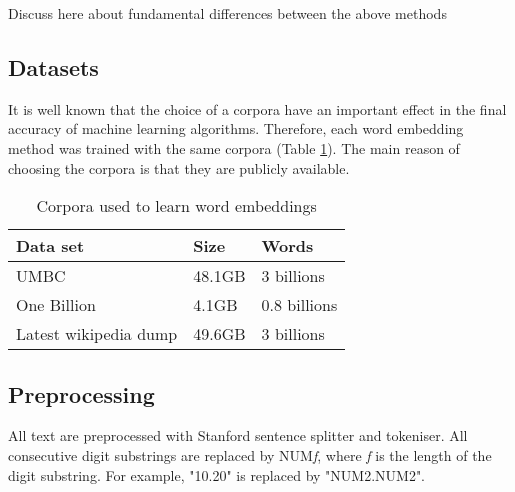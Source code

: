 {\color{red}Discuss here about fundamental differences between the above methods}

\subsection{Datasets}
It is well known that the choice of a corpora have an important effect in the final accuracy of machine learning algorithms. 
Therefore, each word embedding method was trained with the same corpora (Table \ref{wordEmbedCorpora}). The main reason of choosing the corpora 
is that they are publicly available. 

\begin{table}[h]
\begin{center}
\begin{small}
\begin{tabular}{lll}
\hline
\textbf{Data set} & \textbf{Size} & \textbf{Words} \\ \hline
UMBC 	& 48.1GB & 3 billions \\
One Billion 	& 4.1GB & 0.8 billions  \\
Latest wikipedia dump & 49.6GB & 3 billions \\ \hline
\end{tabular}
\end{small}
\caption{Corpora used to learn word embeddings}
\label{wordEmbedCorpora}
\end{center}
\end{table}

\subsection{Preprocessing}
All text are preprocessed with Stanford sentence splitter and tokeniser. All consecutive digit substrings are replaced by NUM\textit{f}, where \textit{f} is the length of the digit substring. For example, "10.20" is replaced by "NUM2.NUM2".
